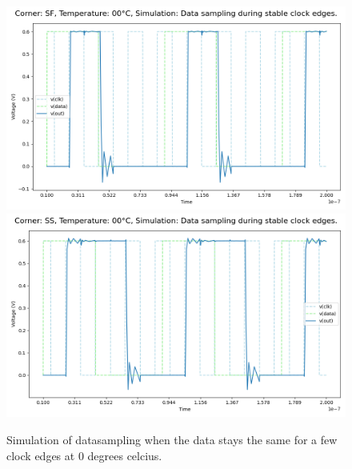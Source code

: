 \begin{figure}[H]
    \vspace{5pt}
    \includegraphics[height= 0.21\textheight]{figures/aimspice/SF00W2.png}
    \vspace{5pt}
    \includegraphics[height= 0.21\textheight]{figures/aimspice/SS00W2.png}
    \caption{Simulation of datasampling when the data stays the same for a few clock edges at 0 degrees celcius.}
    \label{fig:aimspice_W2_0}
\end{figure}

\pagebreak

